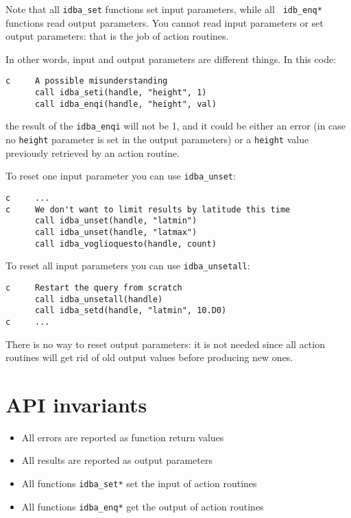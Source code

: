 \documentclass[final,12pt,a4paper,twoside]{book}
\begin{document}
Note that all {\tt idba\_set} functions set input parameters, while all {\tt
idb\_enq*} functions read output parameters.  You cannot read input parameters
or set output parameters: that is the job of action routines.

In other words, input and output parameters are different things.  In this
code:

\begin{verbatim}
c     A possible misunderstanding
      call idba_seti(handle, "height", 1)
      call idba_enqi(handle, "height", val)
\end{verbatim}

the result of the {\tt idba\_enqi} will not be 1, and it could be either an error
(in case no {\tt height} parameter is set in the output parameters) or a
{\tt height} value previously retrieved by an action routine.

To reset one input parameter you can use {\tt idba\_unset}:
\label{fun-idba_unset}

\begin{verbatim}
c     ...
c     We don't want to limit results by latitude this time
      call idba_unset(handle, "latmin")
      call idba_unset(handle, "latmax")
      call idba_voglioquesto(handle, count)
\end{verbatim}

To reset all input parameters you can use {\tt idba\_unsetall}:
\label{fun-idba_unsetall}

\begin{verbatim}
c     Restart the query from scratch
      call idba_unsetall(handle)
      call idba_setd(handle, "latmin", 10.D0)
c     ...
\end{verbatim}

There is no way to reset output parameters: it is not needed since all action
routines will get rid of old output values before producing new ones.


\section {API invariants}

\begin{itemize}
\item All errors are reported as function return values
\item All results are reported as output parameters
\item All functions {\tt idba\_set*} set the input of action routines
\item All functions {\tt idba\_enq*} get the output of action routines
\end{itemize}
\end{document}
